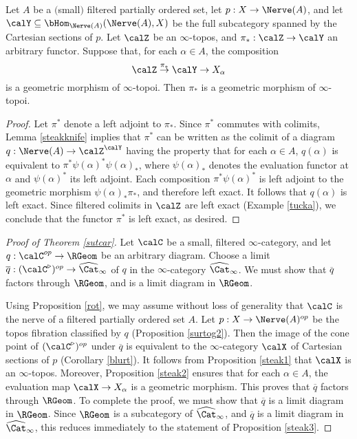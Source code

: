 \begin{proposition}\label{steak3}
Let $A$ be a $($small$)$ filtered partially ordered set, let $p: X \rightarrow \Nerve(A)$, and let
$\calY \subseteq \bHom_{ \Nerve(A)}(\Nerve(A), X)$ be the full subcategory spanned by the Cartesian sections of $p$. Let $\calZ$ be an $\infty$-topos, and $\pi_{\ast}: \calZ \rightarrow \calY$ an arbitrary functor. Suppose that, for each $\alpha \in A$, the composition
$$ \calZ \stackrel{\pi_{\ast}}{\rightarrow} \calY \rightarrow X_{\alpha}$$
is a geometric morphism of $\infty$-topoi. Then $\pi_{\ast}$ is a geometric morphism of $\infty$-topoi.
\end{proposition}

\begin{proof}
Let $\pi^{\ast}$ denote a left adjoint to $\pi_{\ast}$. Since $\pi^{\ast}$ commutes with colimits,
Lemma \ref{steakknife} implies that $\pi^{\ast}$ can be written as the colimit of a diagram
$q: \Nerve(A) \rightarrow \calZ^{\calY}$ having the property that for each
$\alpha \in A$, $q(\alpha)$ is equivalent to $\pi^{\ast} \psi(\alpha)^{\ast} \psi(\alpha)_{\ast}$,
where $\psi(\alpha)_{\ast}$ denotes the evaluation functor at $\alpha$ and $\psi(\alpha)^{\ast}$ its left adjoint. Each composition $\pi^{\ast} \psi(\alpha)^{\ast}$ is left adjoint to the geometric morphism
$\psi(\alpha)_{\ast} \pi_{\ast}$, and therefore left exact. It follows that $q(\alpha)$ is left exact.
Since filtered colimits in $\calZ$ are left exact (Example \ref{tucka}), we conclude that
the functor $\pi^{\ast}$ is left exact, as desired.
\end{proof}

\begin{proof}[Proof of Theorem \ref{sutcar}]
Let $\calC$ be a small, filtered $\infty$-category, and let $q: \calC^{op} \rightarrow \RGeom$
be an arbitrary diagram. Choose a limit $\overline{q}: (\calC^{\triangleright})^{op} \rightarrow \widehat{\Cat}_{\infty}$ of $q$ in the $\infty$-category $\widehat{\Cat}_{\infty}$. We must show that
$\overline{q}$ factors through $\RGeom$, and is a limit diagram in $\RGeom$.

Using Proposition \ref{rot}, we may assume without loss of generality that $\calC$ is the nerve of a filtered partially ordered set $A$. Let $p: X \rightarrow \Nerve(A)^{op}$ be the topos fibration classified by $q$ (Proposition \ref{surtog2}). Then the image of the cone point of $( \calC^{\triangleright})^{op}$ under $\overline{q}$ is equivalent to the $\infty$-category $\calX$ of Cartesian sections of $p$ (Corollary \ref{blurt}). It follows from Proposition \ref{steak1} that
$\calX$ is an $\infty$-topos. Moreover, Proposition \ref{steak2} ensures that for each $\alpha \in A$, the evaluation map $\calX \rightarrow X_{\alpha}$ is a geometric morphism. This proves that 
$\overline{q}$ factors through $\RGeom$. To complete the proof, we must show that $\overline{q}$ is a limit diagram in $\RGeom$. Since $\RGeom$ is a subcategory of $\widehat{\Cat}_{\infty}$, and $\overline{q}$ is a limit diagram in $\widehat{\Cat}_{\infty}$, this reduces immediately to the statement of Proposition \ref{steak3}.
\end{proof}

